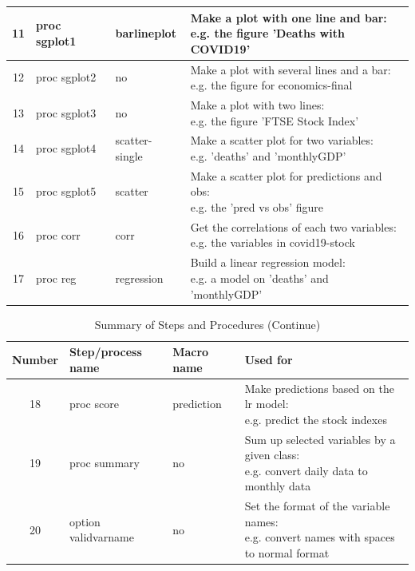 \documentclass[12pt, a4paper]{report}
\begin{document}
\begin{appendices}
\begin{table}[H]
\begin{tabular}{|c|l|l|l|}
        \hline
        11&proc sgplot1&barlineplot&\makecell[l]{Make a plot with one line and bar:\\e.g. the figure 'Deaths with COVID19'}\\
        \hline
        12&proc sgplot2&no&\makecell[l]{Make a plot with several lines and a bar:\\e.g. the figure for economics-final}\\
        \hline
        13&proc sgplot3&no&\makecell[l]{Make a plot with two lines:\\e.g. the figure 'FTSE Stock Index'}\\
        \hline
        14&proc sgplot4&scatter-single&\makecell[l]{Make a scatter plot for two variables:\\e.g. 'deaths' and 'monthlyGDP'}\\
        \hline
        15&proc sgplot5&scatter&\makecell[l]{Make a scatter plot for predictions and obs:\\e.g. the 'pred vs obs' figure}\\
        \hline
        16&proc corr&corr&\makecell[l]{Get the correlations of each two variables:\\e.g. the variables in covid19-stock}\\
        \hline
        17&proc reg&regression&\makecell[l]{Build a linear regression model:\\e.g. a model on 'deaths' and 'monthlyGDP'}\\
        \hline        

    \end{tabular}
\end{table}   

\setcounter{table}{0}
\begin{table}[H]
    \caption{Summary of Steps and Procedures (Continue)}
    \begin{tabular}{|c|l|l|l|}
        \hline
        Number&Step/process name&Macro name&Used for\\
        \hline
        18&proc score&prediction&\makecell[l]{Make predictions based on the lr model:\\e.g. predict the stock indexes}\\
        \hline
        19&proc summary&no&\makecell[l]{Sum up selected variables by a given class:\\e.g. convert daily data to monthly data}\\
        \hline
        20&option validvarname&no&\makecell[l]{Set the format of the variable names:\\e.g. convert names with spaces
        to normal format}\\
        \hline

    \end{tabular}
\end{table} 

\end{appendices}
\end{document}
